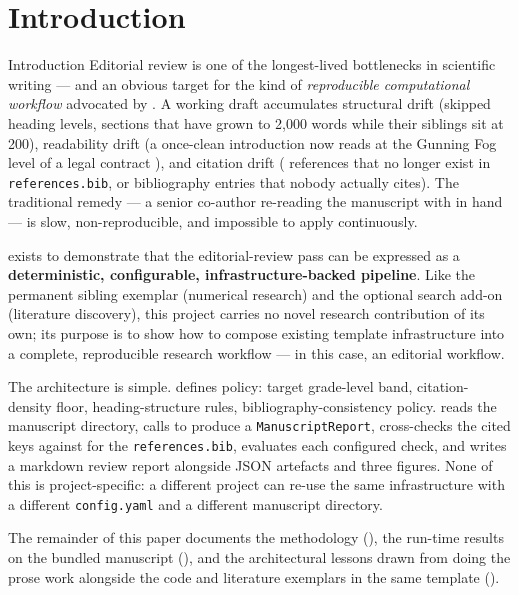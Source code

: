 \documentclass[
  ignorenonframetext,
]{beamer}
\author{\texorpdfstring{}{}}
\date{}
\begin{document}
\section{Introduction}\label{sec:introduction}

\begin{frame}{Introduction}
Editorial review is one of the longest-lived bottlenecks in scientific
writing --- and an obvious target for the kind of \emph{reproducible
computational workflow} advocated by . A
working draft accumulates structural drift (skipped heading levels,
sections that have grown to 2,000 words while their siblings sit at
200), readability drift (a once-clean introduction now reads at the
Gunning Fog level of a legal contract ), and
citation drift (\texttt{\breakseq{[@key]}} references that no longer exist in
\texttt{references.bib}, or bibliography entries that nobody actually
cites). The traditional remedy --- a senior co-author re-reading the
manuscript with  in hand --- is slow,
non-reproducible, and impossible to apply continuously.

 exists to demonstrate that the
editorial-review pass can be expressed as a \textbf{deterministic,
configurable, infrastructure-backed pipeline}. Like the permanent
sibling exemplar
\href{../../template_code_project}{}
(numerical research) and the optional search add-on
\href{../../../projects_archive/template_search_project}{}
(literature discovery), this project carries no novel research
contribution of its own; its purpose is to show how to compose existing
template infrastructure into a complete, reproducible research workflow
--- in this case, an editorial workflow.

The architecture is simple.  defines
policy: target grade-level band, citation-density floor,
heading-structure rules, bibliography-consistency policy.
 reads the manuscript
directory, calls
\href{../../../infrastructure/prose/SKILL.md}{}
to produce a \texttt{ManuscriptReport}, cross-checks the cited keys
against
\href{../../../infrastructure/reference/citation/SKILL.md}{}
for the \texttt{references.bib}, evaluates each configured check, and
writes a markdown review report alongside JSON artefacts and three
figures. None of this is project-specific: a different project can
re-use the same infrastructure with a different \texttt{config.yaml} and
a different manuscript directory.

The remainder of this paper documents the methodology
(), the run-time results on the bundled manuscript
(), and the architectural lessons drawn from doing the
prose work alongside the code and literature exemplars in the same
template ().
\end{frame}
\end{document}
